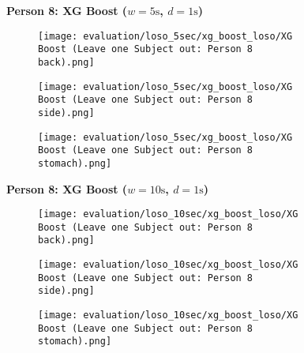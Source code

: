 \begin{figure}
    \textbf{Person 8: XG Boost ($w=5\si{\s}$, $d=1\si{\s}$)}
      \centering
      \begin{subfigure}{1\textwidth}
          \texttt{[image: evaluation/loso\_5sec/xg\_boost\_loso/XG Boost (Leave one Subject out: Person 8 back).png]}
        \end{subfigure}
        \begin{subfigure}{1\textwidth}
          \texttt{[image: evaluation/loso\_5sec/xg\_boost\_loso/XG Boost (Leave one Subject out: Person 8 side).png]}
        \end{subfigure}
        \begin{subfigure}{1\textwidth}
          \texttt{[image: evaluation/loso\_5sec/xg\_boost\_loso/XG Boost (Leave one Subject out: Person 8 stomach).png]}
      \end{subfigure}
        \textbf{Person 8: XG Boost ($w=10\si{\s}$, $d=1\si{\s}$)}
      \centering
      \begin{subfigure}{1\textwidth}
          \texttt{[image: evaluation/loso\_10sec/xg\_boost\_loso/XG Boost (Leave one Subject out: Person 8 back).png]}
        \end{subfigure}
        \begin{subfigure}{1\textwidth}
          \texttt{[image: evaluation/loso\_10sec/xg\_boost\_loso/XG Boost (Leave one Subject out: Person 8 side).png]}
        \end{subfigure}
        \begin{subfigure}{1\textwidth}
          \texttt{[image: evaluation/loso\_10sec/xg\_boost\_loso/XG Boost (Leave one Subject out: Person 8 stomach).png]}
      \end{subfigure}
  
      \label{evaluation:xgboost_loso:person8}
\end{figure}

